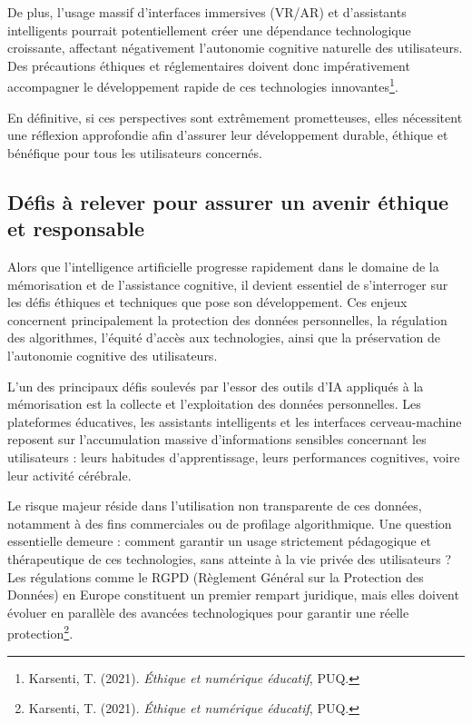 \documentclass[11pt,a4paper]{report}
\begin{document}
De plus, l’usage massif d’interfaces immersives (VR/AR) et d’assistants intelligents pourrait potentiellement créer une dépendance technologique croissante, affectant négativement l’autonomie cognitive naturelle des utilisateurs. Des précautions éthiques et réglementaires doivent donc impérativement accompagner le développement rapide de ces technologies innovantes\footnote{Karsenti, T. (2021). \textit{Éthique et numérique éducatif}, PUQ.}.

En définitive, si ces perspectives sont extrêmement prometteuses, elles nécessitent une réflexion approfondie afin d’assurer leur développement durable, éthique et bénéfique pour tous les utilisateurs concernés.

\subsection{Défis à relever pour assurer un avenir éthique et responsable}

Alors que l’intelligence artificielle progresse rapidement dans le domaine de la mémorisation et de l’assistance cognitive, il devient essentiel de s’interroger sur les défis éthiques et techniques que pose son développement. Ces enjeux concernent principalement la protection des données personnelles, la régulation des algorithmes, l’équité d’accès aux technologies, ainsi que la préservation de l’autonomie cognitive des utilisateurs.

L’un des principaux défis soulevés par l’essor des outils d’IA appliqués à la mémorisation est la collecte et l’exploitation des données personnelles. Les plateformes éducatives, les assistants intelligents et les interfaces cerveau-machine reposent sur l’accumulation massive d’informations sensibles concernant les utilisateurs : leurs habitudes d’apprentissage, leurs performances cognitives, voire leur activité cérébrale.

Le risque majeur réside dans l’utilisation non transparente de ces données, notamment à des fins commerciales ou de profilage algorithmique. Une question essentielle demeure : comment garantir un usage strictement pédagogique et thérapeutique de ces technologies, sans atteinte à la vie privée des utilisateurs ? Les régulations comme le RGPD (Règlement Général sur la Protection des Données) en Europe constituent un premier rempart juridique, mais elles doivent évoluer en parallèle des avancées technologiques pour garantir une réelle protection\footnote{Karsenti, T. (2021). \textit{Éthique et numérique éducatif}, PUQ.}.
\end{document}
